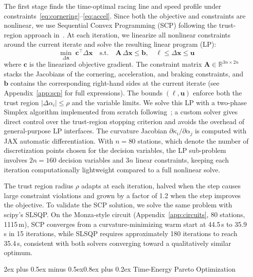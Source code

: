 \documentclass[conf]{new-aiaa}
\makeatletter
\renewcommand\section{\@startsection{section}{1}{\z@}%
  {2ex plus 0.5ex minus 0.5ex}{0.8ex plus 0.2ex}%
  {\normalfont\large\bfseries\centering}}
\makeatother
\begin{document}
The first stage finds the time-optimal racing line and speed profile under
constraints~\eqref{eq:cornering}--\eqref{eq:accel}. Since both the objective and constraints are
nonlinear, we use Sequential Convex Programming (SCP) following the trust-region approach
in~\cite{Kochenderfer2019}. At each iteration, we linearize all nonlinear constraints around the
current iterate and solve the resulting linear program (LP):
\begin{equation}\label{eq:lp}
  \min_{\Delta\mathbf{x}} \; \mathbf{c}^\top \Delta\mathbf{x} \quad \text{s.t.} \quad
  \mathbf{A}\,\Delta\mathbf{x} \leq \mathbf{b}, \quad \boldsymbol{\ell} \leq \Delta\mathbf{x} \leq \mathbf{u}
\end{equation}
where $\mathbf{c}$ is the linearized objective gradient. The constraint matrix
$\mathbf{A} \in \mathbb{R}^{3n \times 2n}$ stacks the Jacobians of the cornering, acceleration,
and braking constraints, and $\mathbf{b}$ contains the corresponding right-hand sides at the
current iterate (see Appendix~\ref{app:scp} for full expressions). The bounds $(\boldsymbol{\ell},
\mathbf{u})$ enforce both the trust region $|\Delta\alpha_i| \leq \rho$ and the variable limits.
We solve this LP with a two-phase Simplex algorithm implemented from scratch
following~\cite{Kochenderfer2019}; a custom solver gives direct control over the trust-region
stopping criterion and avoids the overhead of general-purpose LP interfaces. The curvature
Jacobian $\partial\kappa_i / \partial\alpha_j$ is computed with JAX automatic differentiation. With $n = 80$ stations, which denote the number of discretization points chosen for the decision variables, the LP sub-problem involves $2n = 160$
decision variables and $3n$ linear constraints, keeping each iteration computationally lightweight
compared to a full nonlinear solve.

The trust region radius $\rho$ adapts at each iteration, halved when the step causes large
constraint violations and grown by a factor of 1.2 when the step improves the objective. To validate
the SCP solution, we solve the same problem with scipy's SLSQP. On the Monza-style circuit
(Appendix~\ref{app:circuits}, 80 stations, 1115\,m), SCP converges from a curvature-minimizing
warm start at 44.5\,s to 35.9\,s in 15 iterations, while SLSQP requires approximately 180
iterations to reach 35.4\,s, consistent with both solvers converging toward a qualitatively similar
optimum.

\section{Time-Energy Pareto Optimization}
\end{document}
